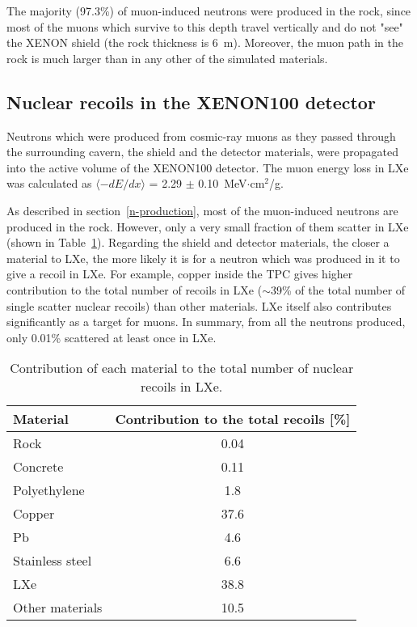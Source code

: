 The majority (97.3\%) of muon-induced neutrons were produced in the rock,
since most of the muons which survive to this depth travel
vertically and do not "see" the XENON shield  
(the rock thickness is 6~m). Moreover, the muon path in the rock is much 
larger than in any other of the simulated materials.

\subsection{Nuclear recoils in the XENON100 detector} 

Neutrons which were produced from cosmic-ray muons as they passed through the surrounding cavern, the shield and the detector materials, were propagated into the active volume
of the XENON100 detector.
The muon energy loss in LXe was calculated as $\langle-dE/dx\rangle$ = 2.29 $\pm$ 0.10~MeV$\cdot$cm$^2$/g. 

As described in section~\ref{n-production}, most of the muon-induced neutrons are produced in the rock.  However, only a very small fraction of them scatter in LXe (shown in Table~\ref{tab:recoils}). 
Regarding the shield and detector materials, the closer a material to LXe, 
the more likely it is for a neutron which was produced in it to give a recoil in LXe.
For example, copper inside the TPC gives higher contribution to the total number of recoils in LXe ($\sim$39\% of the total number of single scatter nuclear recoils) than other materials. 
LXe itself also contributes significantly as a target for muons. In summary, from all the neutrons produced, only 0.01\% scattered at least once in LXe.

\begin{table}[ht]
\centering
\caption{Contribution of each material to the total number of nuclear recoils in LXe.}
\vspace{0.3cm}
\begin{tabular}{lc}
\hline
\bf{Material} &  \bf{Contribution to the total recoils} [\%]  \\
\hline
Rock &  0.04\\
Concrete  & 0.11\\
Polyethylene & 1.8 \\
Copper & 37.6 \\
Pb & 4.6 \\
Stainless steel & 6.6\\
LXe & 38.8 \\
Other materials & 10.5 \\
\hline
\end{tabular}
\label{tab:recoils}
\end{table}

